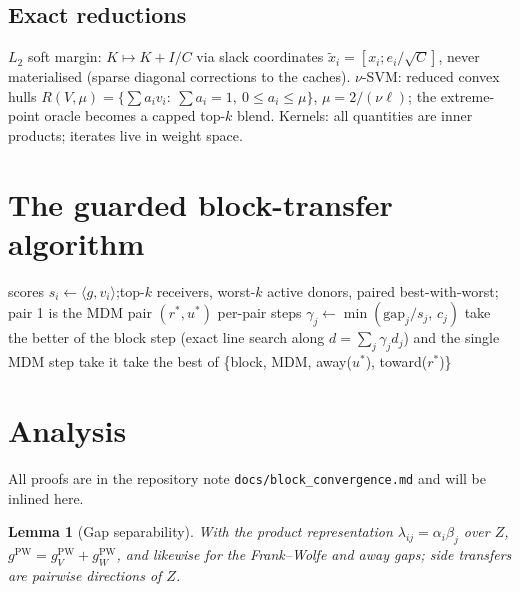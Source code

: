 \documentclass[11pt]{article}
\newtheorem{lemma}{Lemma}
\theoremstyle{remark}
\newcommand{\ip}[2]{\langle #1, #2 \rangle}
\begin{document}

\subsection{Exact reductions}
$L_2$ soft margin: $K\mapsto K+I/C$ via slack coordinates
$\tilde x_i=[x_i;e_i/\sqrt{C}]$, never materialised (sparse diagonal
corrections to the caches). $\nu$-SVM: reduced convex hulls
$R(V,\mu)=\{\sum a_i v_i:\ \sum a_i=1,\ 0\le a_i\le\mu\}$,
$\mu=2/(\nu\ell)$; the extreme-point oracle becomes a capped top-$k$
blend. Kernels: all quantities are inner products; iterates live in
weight space. %

\section{The guarded block-transfer algorithm}
\begin{algorithm}[h]
\caption{Guarded block transfer with away fallback (one side, one iteration)}
\begin{algorithmic}[1]
\State scores $s_i\gets\ip{g}{v_i}$;\quad top-$k$ receivers, worst-$k$
active donors, paired best-with-worst; pair 1 is the MDM pair $(r^*,u^*)$
\State per-pair steps $\gamma_j\gets\min(\mathrm{gap}_j/s_j,\,c_j)$
  \State take the better of the block step (exact line search along
  $d=\sum_j\gamma_j d_j$) and the single MDM step 
\Else
     \State take it 
  \Else
     \State take the best of \{block, MDM, away($u^*$), toward($r^*$)\}
  \EndIf
\EndIf
\end{algorithmic}
\end{algorithm}


\section{Analysis}
All proofs are in the repository note \texttt{docs/block\_convergence.md}
and will be inlined here. %

\begin{lemma}[Gap separability]
With the product representation $\lambda_{ij}=\alpha_i\beta_j$ over $Z$,
$g^{\mathrm{PW}}=g^{\mathrm{PW}}_V+g^{\mathrm{PW}}_W$, and likewise for
the Frank--Wolfe and away gaps; side transfers are pairwise directions of
$Z$.
\end{lemma}
\end{document}
